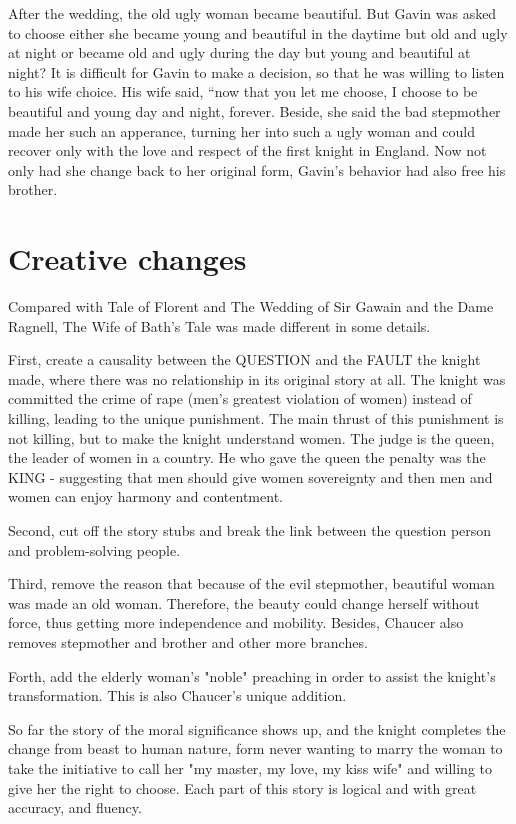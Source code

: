 After the wedding, the old ugly woman became beautiful. But Gavin was asked to choose either she became young and beautiful in the daytime but old and ugly at night or became old and ugly during the day but young and beautiful at night? It is difficult for Gavin to make a decision, so that he was willing to listen to his wife choice. His wife said, “now that you let me choose, I choose to be beautiful and young day and night, forever. Beside, she said the bad stepmother made her such an apperance, turning her into such a ugly woman and could recover only with the love and respect of the first knight in England. Now not only had she change back to her original form, Gavin's behavior had also free his brother.
\section{Creative changes}
\label{Creative changes}
Compared with Tale of Florent and The Wedding of Sir Gawain and the Dame Ragnell, The Wife of Bath's Tale was made different in some details.

First, create a causality between the QUESTION and the FAULT the knight made, where there was no relationship in its original story at all. The knight was committed the crime of rape (men's greatest violation of women) instead of killing, leading to the unique punishment. The main thrust of this punishment is not killing, but to make the knight understand women. The judge is the queen, the leader of women in a country. He who gave the queen the penalty was the KING - suggesting that men should give women sovereignty and then men and women can enjoy harmony and contentment.

Second, cut off the story stubs and break the link between the question person and problem-solving people.

Third, remove the reason that because of the evil stepmother, beautiful woman was made an old woman. Therefore, the beauty could change herself without force, thus getting more independence and mobility. Besides, Chaucer also removes stepmother and brother and other more branches.

Forth, add the elderly woman's "noble" preaching in order to assist the knight's transformation. This is also Chaucer's unique addition.

So far the story of the moral significance shows up, and the knight completes the change from beast to human nature, form never wanting to marry the woman to take the initiative to call her "my master, my love, my kiss wife" and willing to give her the right to choose. Each part of this story is logical and with great accuracy, and fluency.

